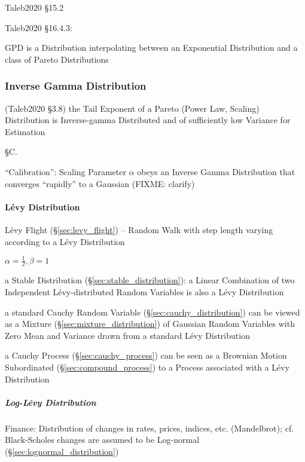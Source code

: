 Taleb2020 \S 15.2

Taleb2020 \S 16.4.3:

GPD is a Distribution interpolating between an Exponential Distribution and a
class of Pareto Distributions



\subsubsection{Inverse Gamma Distribution}\label{sec:inverse_gamma}


(Taleb2020 \S 3.8) the Tail Exponent of a Pareto (Power Law, Scaling)
Distribution is Inverse-gamma Distributed and of sufficiently low Variance for
Estimation

\S C.

``Calibration'': Scaling Parameter $\alpha$ obeys an Inverse Gamma Distribution
that converges ``rapidly'' to a Gaussian (FIXME: clarify)



\paragraph{L\'evy Distribution}\label{sec:levy_distribution}\hfill

L\'evy Flight (\S\ref{sec:levy_flight}) -- Random Walk with step length varying
according to a L\'evy Distribution

$\alpha = \frac{1}{2}, \beta = 1$

a Stable Distribution (\S\ref{sec:stable_distribution}): a Linear Combination of
two Independent L\'evy-distributed Random Variables is also a L\'evy
Distribution

a standard Cauchy Random Variable (\S\ref{sec:cauchy_distribution}) can be
viewed as a Mixture (\S\ref{sec:mixture_distribution}) of Gaussian Random
Variables with Zero Mean and Variance drawn from a standard L\'evy Distribution

a Cauchy Process (\S\ref{sec:cauchy_process}) can be seen as a Brownian Motion
Subordinated (\S\ref{sec:compound_process}) to a Process associated with a
L\'evy Distribution



\subparagraph{Log-L\'evy Distribution}\label{sec:log_levy}\hfill

Finance: Distribution of changes in rates, prices, indices, etc. (Mandelbrot);
cf. Black-Scholes changes are assumed to be Log-normal
(\S\ref{sec:lognormal_distribution})



